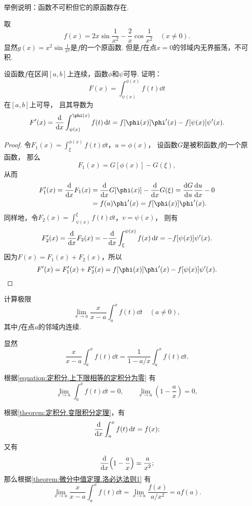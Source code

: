 \begin{example}
举例说明：函数不可积但它的原函数存在.
\begin{solution}
取\[
	f(x) = 2 x \sin\frac1{x^2} - \frac2x \cos\frac1{x^2}
	\quad(x\neq0).
\]
显然\(g(x) = x^2 \sin\frac1{x^2}\)是\(f\)的一个原函数.
但是\(f\)在点\(x=0\)的邻域内无界振荡，不可积.
\end{solution}
\end{example}

\begin{example}
设函数\(f\)在区间\([a,b]\)上连续，函数\(\phi\)和\(\psi\)可导.
证明：\[
	F(x) = \int_{\psi(x)}^{\phi(x)} f(t) \dd{t}
\]在\([a,b]\)上可导，
且其导数为\begin{equation}\label{equation:定积分.含参变量积分的导数1}
	F'(x) = \dv{x} \int_{\psi(x)}^{\phi(x)} f(t) \dd{t}
	= f[\phi(x)] \phi'(x) - f[\psi(x)] \psi'(x).
\end{equation}
\begin{proof}
令\(F_1(x) = \int_{\xi}^{\phi(x)} f(t) \dd{t}\)，\(u = \phi(x)\)，
设函数\(G\)是被积函数\(f\)的一个原函数，
那么\[
	F_1(x) = G[\phi(x)] - G(\xi),
\]
从而\begin{align*}
	F'_1(x) = \dv{x} F_1(x)
	&= \dv{x} G[\phi(x)] - \dv{x} G(\xi) = \dv{G}{u} \dv{u}{x} - 0 \\
	&= f(u) \phi'(x) = f[\phi(x)] \phi'(x).
\end{align*}
同样地，令\(F_2(x) = \int_{\psi(x)}^{\xi} f(t) \dd{t}\)，\(v = \psi(x)\)，
则有\[
	F'_2(x) = \dv{x} F_2(x) = -\dv{x} \int_{\xi}^{\psi(x)} f(x) \dd{t}
	= -f[\psi(x)] \psi'(x).
\]
因为\(F(x) = F_1(x) + F_2(x)\)，所以\[
	F'(x) = F'_1(x) + F'_2(x)
	= f[\phi(x)] \phi'(x) - f[\psi(x)] \psi'(x).
	\qedhere
\]
\end{proof}
\end{example}

\begin{example}
计算极限\[
	\lim_{x \to a} \frac{x}{x-a} \int_a^x f(t) \dd{t}
	\quad(a\neq0),
\]
其中\(f\)在点\(a\)的邻域内连续.
\begin{solution}
显然\[
	\frac{x}{x-a} \int_a^x f(t) \dd{t}
	= \frac1{1 - a/x} \int_a^x f(t) \dd{t}.
\]

根据\cref{equation:定积分.上下限相等的定积分为零} 有\[
	\lim_{x \to a} \int_a^x f(t) \dd{t} = 0, \qquad
	\lim_{x \to a} \left( 1 - \frac{a}{x} \right) = 0,
\]

根据\cref{theorem:定积分.变限积分定理}，有\[
	\dv{x} \int_a^x f(t) \dd{t} = f(x);
\]
又有\[
	\dv{x}(1 - \frac{a}{x}) = \frac{a}{x^2};
\]
那么根据\cref{theorem:微分中值定理.洛必达法则1} 有\[
	\lim_{x \to a} \frac{x}{x-a} \int_a^x f(t) \dd{t}
	= \lim_{x \to a} \frac{f(x)}{a/x^2}
	= a f(a).
\]
\end{solution}
\end{example}

